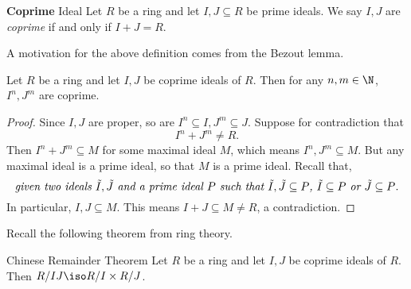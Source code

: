 \documentclass[pmath441]{subfiles}
\begin{document}
    \begin{definition}{\textbf{Coprime} Ideal}
        Let $R$ be a ring and let $I,J\subseteq R$ be prime ideals. We say $I,J$ are \emph{coprime} if and only if $I+J=R$.
    \end{definition}

    \np A motivation for the above definition comes from the Bezout lemma.

    \begin{prop}{}
        Let $R$ be a ring and let $I,J$ be coprime ideals of $R$. Then for any $n,m\in\N$, $I^n,J^m$ are coprime.
    \end{prop}

    \begin{proof}
        Since $I,J$ are proper, so are $I^n\subseteq I, J^m\subseteq J$. Suppose for contradiction that
        \begin{equation*}
            I^n+J^m \neq R.
        \end{equation*}
        Then $I^n+J^m\subseteq M$ for some maximal ideal $M$, which means $I^n,J^m\subseteq M$. But any maximal ideal is a prime ideal, so that $M$ is a prime ideal. Recall that, 
        \begin{equation*}
            \text{\textit{given two ideals $\tilde{I},\tilde{J}$ and a prime ideal $P$ such that $\tilde{I},\tilde{J}\subseteq P$, $\tilde{I}\subseteq P$ or $\tilde{J}\subseteq P$.}}
        \end{equation*}
        In particular, $I,J\subseteq M$. This means $I+J\subseteq M\neq R$, a contradiction.
    \end{proof}

    \np Recall the following theorem from ring theory.

    \begin{theorem}{Chinese Remainder Theorem}
        Let $R$ be a ring and let $I,J$ be coprime ideals of $R$. Then $R /IJ \iso R /I\times R /J$.
    \end{theorem}
\end{document}
